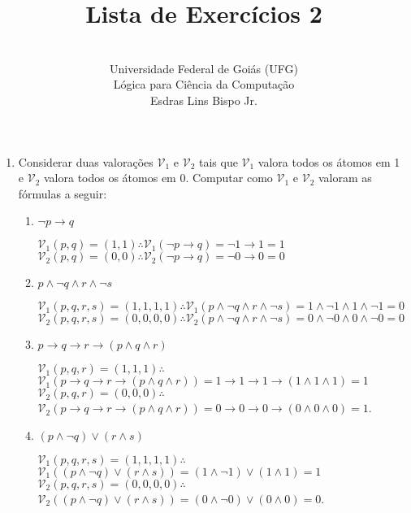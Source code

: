 \documentclass[12pt,a4paper,oneside]{article}
\author{\\Universidade Federal de Goiás (UFG) \\Lógica para Ciência da Computação \\Esdras Lins Bispo Jr.}
\title{\sc \huge Lista de Exercícios 2}
\begin{document}
\maketitle

\begin{enumerate}

	\item Considerar duas valorações $\mathcal{V}_1$ e $\mathcal{V}_2$ tais que $\mathcal{V}_1$ valora todos os átomos em 1 e $\mathcal{V}_2$ valora todos os átomos em 0. Computar como $\mathcal{V}_1$ e $\mathcal{V}_2$ valoram as fórmulas a seguir:

		\begin{enumerate}
			\item $\neg p \rightarrow q$
			
			{\color{verde}$\mathcal{V}_1(p,q)=(1,1) \therefore \mathcal{V}_1(\neg p \rightarrow q) = \neg 1 \rightarrow 1 = 1$ \\
			$\mathcal{V}_2(p,q)=(0,0) \therefore \mathcal{V}_2(\neg p \rightarrow q) = \neg 0 \rightarrow 0 = 0$}
			
			\item $p \wedge \neg q \wedge r \wedge \neg s$
			
			{\color{verde} $\mathcal{V}_1(p,q,r,s)=(1,1,1,1) \therefore \mathcal{V}_1(p \wedge \neg q \wedge r \wedge \neg s) = 1 \wedge \neg 1 \wedge 1 \wedge \neg 1 = 0$ \\
			$\mathcal{V}_2(p,q,r,s)=(0,0,0,0) \therefore \mathcal{V}_2(p \wedge \neg q \wedge r \wedge \neg s) = 0 \wedge \neg 0 \wedge 0 \wedge \neg 0 = 0$}
			
			\item $p \rightarrow q \rightarrow r \rightarrow (p \wedge q \wedge r)$
			
			{\color{verde} $\mathcal{V}_1(p,q,r)=(1,1,1) \therefore$ \\
			$\mathcal{V}_1(p \rightarrow q \rightarrow r \rightarrow (p \wedge q \wedge r)) = 1 \rightarrow 1 \rightarrow 1 \rightarrow (1 \wedge 1 \wedge 1) = 1$ \\
			$\mathcal{V}_2(p,q,r)=(0,0,0) \therefore$ \\
			$\mathcal{V}_2(p \rightarrow q \rightarrow r \rightarrow (p \wedge q \wedge r)) = 0 \rightarrow 0 \rightarrow 0 \rightarrow (0 \wedge 0 \wedge 0) = 1$.}
			
			\item $(p \wedge \neg q) \vee (r \wedge s)$
			
			{\color{verde} $\mathcal{V}_1(p,q,r,s)=(1,1,1,1) \therefore$ \\ $\mathcal{V}_1((p \wedge \neg q) \vee (r \wedge s)) = (1 \wedge \neg 1) \vee (1 \wedge 1) = 1$ \\
			$\mathcal{V}_2(p,q,r,s)=(0,0,0,0) \therefore$ \\ $\mathcal{V}_2((p \wedge \neg q) \vee (r \wedge s)) = (0 \wedge \neg 0) \vee (0 \wedge 0) = 0$.}
			

\end{enumerate}
\end{enumerate}
\end{document}
